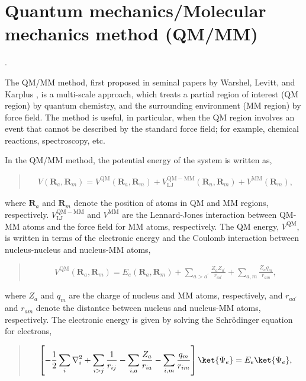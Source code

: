 \documentclass[a4paper,11pt,oneside,english]{sphinxmanual}
\begin{document}
\section{Quantum mechanics/Molecular mechanics method (QM/MM)}
\label{\detokenize{17_QMMM:quantum-mechanics-molecular-mechanics-method-qm-mm}}
 .

The QM/MM method, first proposed in seminal papers by Warshel, Levitt,
and Karplus  , is a multi-scale
approach, which treats a partial region of interest (QM region) by
quantum chemistry, and the surrounding environment (MM region) by
force field.  The method is useful, in particular, when the QM region
involves an event that cannot be described by the standard force field;
for example, chemical reactions, spectroscopy, etc.

In the QM/MM method, the potential energy of the system is written as,
\begin{quote}
\begin{equation*}
\begin{split}V (\mathbf{R}_a, \mathbf{R}_m)
= V^\mathrm{QM} (\mathbf{R}_a, \mathbf{R}_m)
+ V^\mathrm{QM-MM}_\mathrm{LJ} (\mathbf{R}_a, \mathbf{R}_m)
+ V^\mathrm{MM} (\mathbf{R}_m),\end{split}
\end{equation*}\end{quote}

where \(\mathbf{R}_a\) and \(\mathbf{R}_m\) denote the
position of atoms in QM and MM regions, respectively.
\(V^\mathrm{QM-MM}_\mathrm{LJ}\) and \(V^{\mathrm{MM}}\)
are the Lennard-Jones interaction between QM-MM atoms and the
force field for MM atoms, respectively.  The QM energy,
\(V^\mathrm{QM}\), is written in
terms of the electronic energy and the Coulomb interaction
between nucleus-nucleus and nucleus-MM atoms,
\begin{quote}
\begin{equation*}
\begin{split}V^\mathrm{QM} (\mathbf{R}_a, \mathbf{R}_m) = E_e (\mathbf{R}_a, \mathbf{R}_m)
+ \sum_{a > a^\prime} \frac{Z_a Z_{a^\prime}}{r_{a{a^\prime}}}
+ \sum_{a, m} \frac{Z_a q_m}{r_{am}},\end{split}
\end{equation*}\end{quote}

where \(Z_a\) and \(q_m\) are the charge of nucleus and MM atoms,
respectively, and \(r_{a{a^\prime}}\) and \(r_{am}\) denote
the distantce between nucleus and nucleus-MM atoms, respectively.
The electronic energy is given by solving the Schrödinger
equation for electrons,
\begin{quote}
\begin{equation*}
\begin{split}\left[ - \frac{1}{2} \sum_i \nabla_i^2
+ \sum_{i>j} \frac{1}  {r_{ij}}
- \sum_{i,a} \frac{Z_a}{r_{ia}}
- \sum_{i,m} \frac{q_m}{r_{im}} \right] \ket{\Psi_e} = E_e \ket{\Psi_e},\end{split}
\end{equation*}\end{quote}
\end{document}
